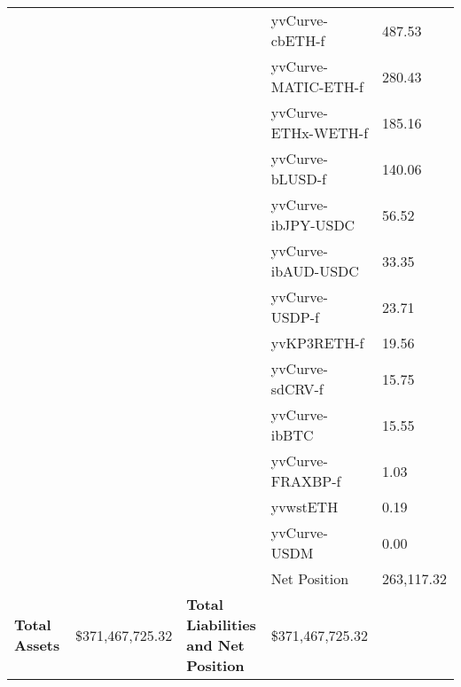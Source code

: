 \begin{longtable}{@{}p{0.25\linewidth}p{0.25\linewidth}p{0.25\linewidth}p{0.25\linewidth}@{}}
 & &  & yvCurve-cbETH-f & 487.53 \\
 & &  & yvCurve-MATIC-ETH-f & 280.43 \\
 & &  & yvCurve-ETHx-WETH-f & 185.16 \\
 & &  & yvCurve-bLUSD-f & 140.06 \\
 & &  & yvCurve-ibJPY-USDC & 56.52 \\
 & &  & yvCurve-ibAUD-USDC & 33.35 \\
 & &  & yvCurve-USDP-f & 23.71 \\
 & &  & yvKP3RETH-f & 19.56 \\
 & &  & yvCurve-sdCRV-f & 15.75 \\
 & &  & yvCurve-ibBTC & 15.55 \\
 & &  & yvCurve-FRAXBP-f & 1.03 \\
 & &  & yvwstETH & 0.19 \\
 & &  & yvCurve-USDM & 0.00 \\
 & &  & Net Position & 263,117.32 \\

\midrule

\textbf{Total Assets} & \$371,467,725.32 & \textbf{Total Liabilities and Net Position} & \$371,467,725.32 \\

\bottomrule

\end{longtable}
